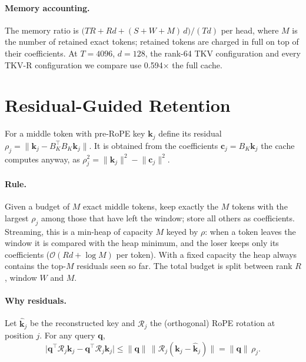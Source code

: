 \documentclass{article}
\begin{document}
\paragraph{Memory accounting.}
The memory ratio is $\bigl(TR + Rd + (S{+}W{+}M)\,d\bigr)/(Td)$ per head, where
$M$ is the number of retained exact tokens; retained tokens are charged in full
on top of their coefficients. At $T{=}4096$, $d{=}128$, the rank-64 TKV
configuration and every TKV-R configuration we compare use 0.594$\times$ the
full cache.

\section{Residual-Guided Retention}
\label{sec:method}

For a middle token with pre-RoPE key $\mathbf{k}_j$ define its residual
$\rho_j = \lVert \mathbf{k}_j - B_K^\top B_K \mathbf{k}_j \rVert$. It is
obtained from the coefficients $\mathbf{c}_j = B_K\mathbf{k}_j$ the cache
computes anyway, as $\rho_j^2 = \lVert\mathbf{k}_j\rVert^2 - \lVert\mathbf{c}_j\rVert^2$.

\paragraph{Rule.} Given a budget of $M$ exact middle tokens, keep exactly the
$M$ tokens with the largest $\rho_j$ among those that have left the window;
store all others as coefficients. Streaming, this is a min-heap of capacity
$M$ keyed by $\rho$: when a token leaves the window it is compared with the
heap minimum, and the loser keeps only its coefficients ($\mathcal{O}(Rd +
\log M)$ per token). With a fixed capacity the heap always contains the top-$M$
residuals seen so far. The total budget is split between rank $R$, window $W$
and $M$.

\paragraph{Why residuals.}
Let $\hat{\mathbf{k}}_j$ be the reconstructed key and $\mathcal{R}_j$ the
(orthogonal) RoPE rotation at position $j$. For any query $\mathbf{q}$,
\begin{equation}
\bigl|\mathbf{q}^\top\mathcal{R}_j\mathbf{k}_j - \mathbf{q}^\top\mathcal{R}_j\hat{\mathbf{k}}_j\bigr|
\le \lVert\mathbf{q}\rVert\,\lVert\mathcal{R}_j(\mathbf{k}_j - \hat{\mathbf{k}}_j)\rVert
= \lVert\mathbf{q}\rVert\,\rho_j .
\label{eq:logit}
\end{equation}
\end{document}
